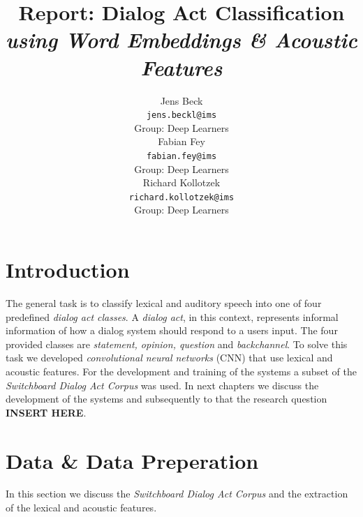\documentclass[11pt,a4paper]{article}
\title{Report: Dialog Act Classification\\\textit{using Word Embeddings \& Acoustic Features}}
\author{Jens Beck \\
  {\tt jens.beckl@ims} \\
  Group: Deep Learners\\\And
  Fabian Fey \\
  {\tt fabian.fey@ims} \\
  Group: Deep Learners\\\And
  Richard Kollotzek \\
  {\tt richard.kollotzek@ims}\\
  Group: Deep Learners\\}
\date{}
\begin{document}
\maketitle

\begin{abstract}
\lipsum[2-2]
\end{abstract}

\section{Introduction}
The general task is to classify lexical and auditory speech into one of four predefined \textit{dialog act classes}. A \textit{dialog act}, in this context, represents informal information of how a dialog system should respond to a users input. The four provided classes are \textit{statement, opinion, question} and \textit{backchannel}. To solve this task we developed \textit{convolutional neural networks} (CNN) that use lexical and acoustic features. For the development and training of the systems a subset of the \textit{Switchboard Dialog Act Corpus} was used. In next chapters we discuss the development of the systems and subsequently to that the research question \textbf{INSERT HERE}.

\section{Data \& Data Preperation}
In this section we discuss the \textit{Switchboard Dialog Act Corpus} and the extraction of the lexical and acoustic features.
\end{document}
